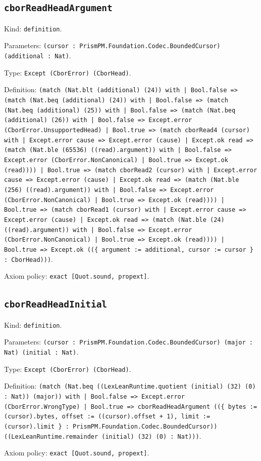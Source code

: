 \documentclass[11pt]{article}
\begin{document}
\subsection*{\texttt{cborReadHeadArgument}}
\noindent Kind: \texttt{definition}.\par
\noindent Parameters: \texttt{(cursor : PrismPM.Foundation.Codec.BoundedCursor) (additional : Nat)}.\par
\noindent Type: \texttt{Except (CborError) (CborHead)}.\par
\noindent Definition: \texttt{(match (Nat.blt (additional) (24)) with | Bool.false => (match (Nat.beq (additional) (24)) with | Bool.false => (match (Nat.beq (additional) (25)) with | Bool.false => (match (Nat.beq (additional) (26)) with | Bool.false => Except.error (CborError.UnsupportedHead) | Bool.true => (match cborRead4 (cursor) with | Except.error cause => Except.error (cause) | Except.ok read => (match (Nat.ble (65536) ((read).argument)) with | Bool.false => Except.error (CborError.NonCanonical) | Bool.true => Except.ok (read)))) | Bool.true => (match cborRead2 (cursor) with | Except.error cause => Except.error (cause) | Except.ok read => (match (Nat.ble (256) ((read).argument)) with | Bool.false => Except.error (CborError.NonCanonical) | Bool.true => Except.ok (read)))) | Bool.true => (match cborRead1 (cursor) with | Except.error cause => Except.error (cause) | Except.ok read => (match (Nat.ble (24) ((read).argument)) with | Bool.false => Except.error (CborError.NonCanonical) | Bool.true => Except.ok (read)))) | Bool.true => Except.ok ((\{ argument := additional, cursor := cursor \} : CborHead)))}.\par
\noindent Axiom policy: \texttt{exact [Quot.sound, propext]}.\par
\subsection*{\texttt{cborReadHeadInitial}}
\noindent Kind: \texttt{definition}.\par
\noindent Parameters: \texttt{(cursor : PrismPM.Foundation.Codec.BoundedCursor) (major : Nat) (initial : Nat)}.\par
\noindent Type: \texttt{Except (CborError) (CborHead)}.\par
\noindent Definition: \texttt{(match (Nat.beq ((LexLeanRuntime.quotient (initial) (32) (0) : Nat)) (major)) with | Bool.false => Except.error (CborError.WrongType) | Bool.true => cborReadHeadArgument ((\{ bytes := (cursor).bytes, offset := ((cursor).offset + 1), limit := (cursor).limit \} : PrismPM.Foundation.Codec.BoundedCursor)) ((LexLeanRuntime.remainder (initial) (32) (0) : Nat)))}.\par
\noindent Axiom policy: \texttt{exact [Quot.sound, propext]}.\par
\end{document}
